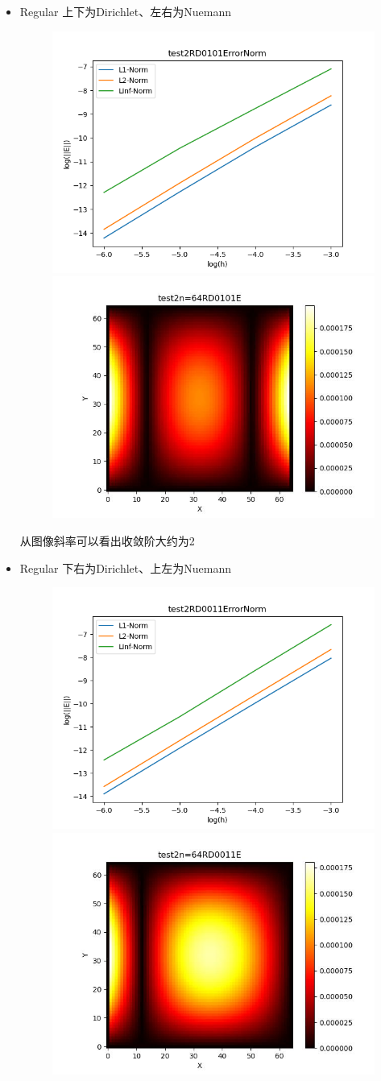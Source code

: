 \documentclass{article}
\begin{document}
\begin{itemize}
    \item Regular 上下为Dirichlet、左右为Nuemann
    \begin{figure}[h]
        \centering
        \includegraphics[width=0.35\linewidth]{test2RD0101ErrorNormjpg.png}
        \includegraphics[width=0.35\linewidth]{test2n=64RD0101E.jpg}
    \end{figure}

    从图像斜率可以看出收敛阶大约为2
    \item Regular 下右为Dirichlet、上左为Nuemann
    \begin{figure}[h]
        \centering
        \includegraphics[width=0.35\linewidth]{test2RD0011ErrorNormjpg.png}
        \includegraphics[width=0.35\linewidth]{test2n=64RD0011E.jpg}
    \end{figure}
    

\end{itemize}
\end{document}
